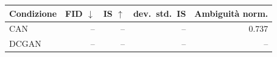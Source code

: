 \begin{tabular}{lrrrr}
  \toprule
  Condizione & FID $\downarrow$ & IS $\uparrow$ & dev.\ std.\ IS & Ambiguità norm. \\
  \midrule
  CAN & -- & -- & -- & 0.737 \\
  DCGAN & -- & -- & -- & -- \\
  \bottomrule
\end{tabular}
